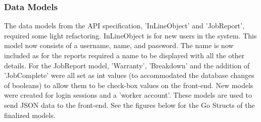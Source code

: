 \subsubsection{Data Models}
The data models from the API specification, 'InLineObject' and 'JobReport', required some light refactoring. InLineObject is for new users in the system. This model now consists of a username, name, and password. The name is now included as for the reports required a name to be displayed with all the other details. For the JobReport model, 'Warranty', 'Breakdown' and the addition of 'JobComplete' were all set as int values (to accommodated the database changes of booleans) to allow them to be check-box values on the front-end. New models were created for login sessions and a 'worker account'. These models are used to send JSON data to the front-end. See the figures below for the Go Structs of the finalized models. 

